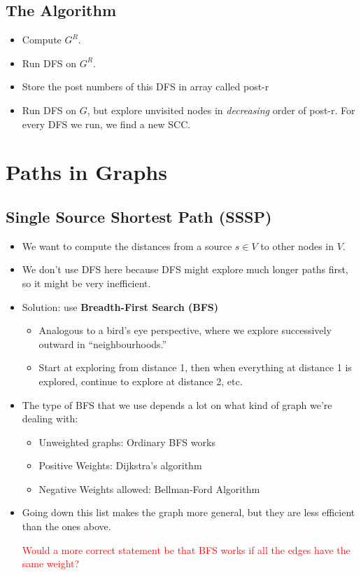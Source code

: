 \documentclass[10pt]{article}
\newcommand{\question}[1]{\textcolor{red}{#1}}
\begin{document}
	\subsection{The Algorithm}
	\begin{itemize}
		\item Compute $G^R$.
		\item Run DFS on $G^R$.
		\item Store the post numbers of this DFS in array called post-r 
		\item Run DFS on $G$, but explore unvisited nodes in \textit{decreasing} order of post-r. For every 
			DFS we run, we find a new SCC.
	\end{itemize}
	\section{Paths in Graphs}

	\subsection{Single Source Shortest Path (SSSP)}
	\begin{itemize}
		\item We want to compute the distances from a source $s \in V$ to other nodes in $V$. 
		\item We don't use DFS here because DFS might explore much longer paths first, so it might be very 
			inefficient.
		\item Solution: use \textbf{Breadth-First Search (BFS)}
			\begin{itemize}
				\item Analogous to a bird's eye perspective, where we explore successively outward in 
					``neighbourhoods.''
				\item Start at exploring from distance 1, then when everything at distance 1 is explored, 
					continue to explore at distance 2, etc. 
			\end{itemize}
		\item The type of BFS that we use depends a lot on what kind of graph we're dealing with:
			\begin{itemize}
				\item Unweighted graphs: Ordinary BFS works
				\item Positive Weights: Dijkstra's algorithm
				\item Negative Weights allowed: Bellman-Ford Algorithm
			\end{itemize}
		\item Going down this list makes the graph more general, but they are less efficient than the ones 
			above. 

			\question{Would a more correct statement be that BFS works if all the edges have the same weight?}
	\end{itemize}
\end{document}
